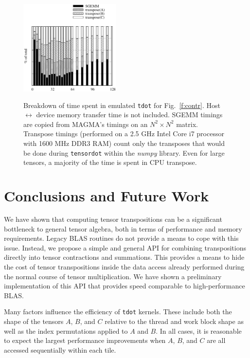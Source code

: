 \documentclass{sigplanconf}
\begin{document}
\begin{figure}
{ \centering
\includegraphics[width=0.45\textwidth]{pct.eps} }
\caption{Breakdown of time spent in emulated {\tt tdot} for Fig.~\ref{f:contr}.
Host $\leftrightarrow$ device memory transfer time is not included.
SGEMM timings are copied from MAGMA's timings on an $N^2 \times N^2$ matrix.
Transpose timings (performed on a 2.5 GHz Intel Core i7 processor with 1600 MHz DDR3 RAM)
count only the transposes that would be done during {\tt tensordot}
within the {\em numpy} library.
Even for large tensors, a majority of the time is spent in CPU transpose.}\label{f:pct}
\end{figure}
  
\section{ Conclusions and Future Work}

  We have shown that computing tensor transpositions can be
a significant
bottleneck to general tensor algebra, both in terms of performance
and memory requirements.  Legacy BLAS routines do not provide
a means to cope with this issue.  Instead, we propose a simple and
general API for combining transpositions directly into
tensor contractions and summations.
This provides a means to hide the cost of tensor transpositions
inside the data access already performed during the
normal course of tensor multiplication.
We have shown a preliminary implementation of this API that provides
speed comparable to high-performance BLAS.

  Many factors influence the efficiency of {\tt tdot} kernels.
These include both the shape of the tensors $A$, $B$, and $C$
relative to the thread and work block shape as well as the
index permutations applied to $A$ and $B$.
In all cases, it is reasonable to expect the largest
performance improvements
when $A$, $B$, and $C$ are all accessed sequentially within each tile.
\end{document}
